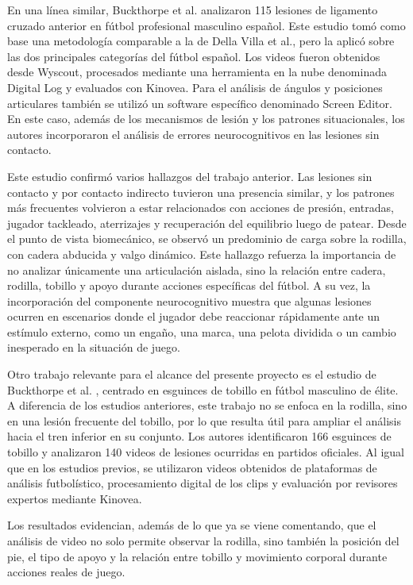 En una línea similar, Buckthorpe et al. \parencite{BuckthorpeEtAl2024ACL} analizaron 115
lesiones de ligamento cruzado anterior en fútbol profesional masculino español. Este estudio
tomó como base una metodología comparable a la de Della Villa et al., pero la aplicó sobre
las dos principales categorías del fútbol español. Los videos fueron obtenidos desde
Wyscout, procesados mediante una herramienta en la nube denominada Digital Log y evaluados
con Kinovea. Para el análisis de ángulos y posiciones articulares también se utilizó un
software específico denominado Screen Editor. En este caso, además de los mecanismos de
lesión y los patrones situacionales, los autores incorporaron el análisis de errores
neurocognitivos en las lesiones sin contacto.

Este estudio confirmó varios hallazgos del trabajo anterior. Las lesiones sin contacto y por
contacto indirecto tuvieron una presencia similar, y los patrones más frecuentes volvieron
a estar relacionados con acciones de presión, entradas, jugador tackleado, aterrizajes y
recuperación del equilibrio luego de patear. Desde el punto de vista biomecánico, se
observó un predominio de carga sobre la rodilla, con cadera abducida y valgo dinámico.
Este hallazgo refuerza la importancia de no analizar únicamente una articulación aislada,
sino la relación entre cadera, rodilla, tobillo y apoyo durante acciones específicas del
fútbol. A su vez, la incorporación del componente neurocognitivo muestra que algunas
lesiones ocurren en escenarios donde el jugador debe reaccionar rápidamente ante un
estímulo externo, como un engaño, una marca, una pelota dividida o un cambio inesperado en
la situación de juego.

Otro trabajo relevante para el alcance del presente proyecto es el estudio de Buckthorpe et
al. \parencite{BuckthorpeEtAl2025Ankle}, centrado en esguinces de tobillo en fútbol
masculino de élite. A diferencia de los estudios anteriores, este trabajo no se enfoca en la
rodilla, sino en una lesión frecuente del tobillo, por lo que resulta útil para ampliar el
análisis hacia el tren inferior en su conjunto. Los autores identificaron 166 esguinces de
tobillo y analizaron 140 videos de lesiones ocurridas en partidos oficiales. Al igual que en
los estudios previos, se utilizaron videos obtenidos de plataformas de análisis futbolístico,
procesamiento digital de los clips y evaluación por revisores expertos mediante Kinovea.

Los resultados evidencian, además de lo que ya se viene comentando, que el análisis de video
no solo permite observar la rodilla, sino también la posición del pie, el tipo de apoyo y
la relación entre tobillo y movimiento corporal durante acciones reales de juego.


